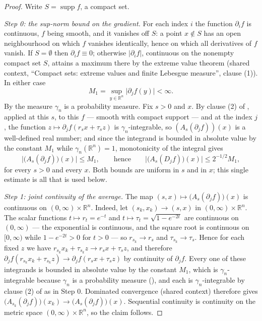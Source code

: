 \begin{proof}
Write $S = \operatorname{supp}f$, a compact set.

\emph{Step 0: the sup-norm bound on the gradient.}
For each index $i$ the function $\partial_i f$ is continuous, $f$ being smooth,
and it vanishes off $S$: a point $x \notin S$ has an open neighbourhood on which
$f$ vanishes identically, hence on which all derivatives of $f$ vanish.  If
$S = \emptyset$ then $\partial_if \equiv 0$; otherwise $|\partial_i f|$,
continuous on the nonempty compact set $S$, attains a maximum there by the
extreme value theorem (shared context, ``Compact sets: extreme values and finite
Lebesgue measure'', clause (1)).  In either case
\[
  M_1 = \sup_{y \in \mathbb{R}^n}\bigl|\partial_j f(y)\bigr| < \infty .
\]
By  the measure $\gamma_n$ is a probability measure.  Fix
$s>0$ and $x$.  By clause (2) of , applied at
this $s$, to this $f$ --- smooth with compact support --- and at the index $j$,
the function $z \mapsto \partial_jf(r_sx+\tau_sz)$ is $\gamma_n$-integrable, so
$(A_s(\partial_jf))(x)$ is a well-defined real number; and since the integrand is
bounded in absolute value by the constant $M_1$ while
$\gamma_n(\mathbb{R}^n) = 1$, monotonicity of the integral gives
\begin{equation*}
  \bigl|\bigl(A_s(\partial_jf)\bigr)(x)\bigr| \leq M_1 ,
  \qquad\text{hence}\qquad
  \bigl|\bigl(A_s(D_jf)\bigr)(x)\bigr| \leq 2^{-1/2}M_1 , \tag{0}
\end{equation*}
for every $s>0$ and every $x$.  Both bounds are uniform in $s$ and in $x$; this
single estimate is all that is used below.

\emph{Step 1: joint continuity of the average.}
The map
$(s,x) \mapsto \bigl(A_s(\partial_jf)\bigr)(x)$
is continuous on $(0,\infty)\times\mathbb{R}^n$.  Indeed, let
$(s_k,x_k) \to (s,x)$ in $(0,\infty)\times\mathbb{R}^n$.  The scalar functions
$t \mapsto r_t = e^{-t}$ and $t \mapsto \tau_t = \sqrt{1-e^{-2t}}$ are continuous
on $(0,\infty)$ --- the exponential is continuous, and the square root is
continuous on $[0,\infty)$ while $1-e^{-2t} > 0$ for $t>0$ --- so
$r_{s_k} \to r_s$ and $\tau_{s_k} \to \tau_s$.  Hence for each fixed $z$ we have
$r_{s_k}x_k+\tau_{s_k}z \to r_sx+\tau_sz$, and therefore
$\partial_jf(r_{s_k}x_k+\tau_{s_k}z) \to \partial_jf(r_sx+\tau_sz)$ by
continuity of $\partial_jf$.  Every one of these integrands is bounded in
absolute value by the constant $M_1$, which is $\gamma_n$-integrable because
$\gamma_n$ is a probability measure (), and each is
$\gamma_n$-integrable by clause (2) of  as in
Step 0.  Dominated convergence (shared context) therefore gives
$\bigl(A_{s_k}(\partial_jf)\bigr)(x_k) \to \bigl(A_s(\partial_jf)\bigr)(x)$.
Sequential continuity is continuity on the metric space
$(0,\infty)\times\mathbb{R}^n$, so the claim follows.


\end{proof}
